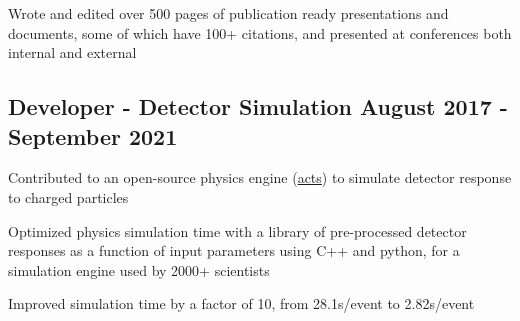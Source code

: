 \documentclass[letter,10pt]{article}
\begin{document}
\begin{zitemize}
\item Wrote and edited over 500 pages of publication ready presentations and documents, some of which have 100+ citations, and presented at conferences both internal and external
\end{zitemize}
\subsection{{Developer - Detector Simulation  \hfill August 2017 - September 2021 }}
\begin{zitemize}
\item Contributed to an open-source physics engine (\href{https://github.com/acts-project/acts/}{acts}) to simulate detector response to charged particles
\item Optimized physics simulation time with a library of pre-processed detector responses as a function of input parameters using C++ and python, for a simulation engine used by 2000+ scientists 
\item Improved simulation time by a factor of 10, from 28.1s/event to 2.82s/event
\end{zitemize}

\end{document}
